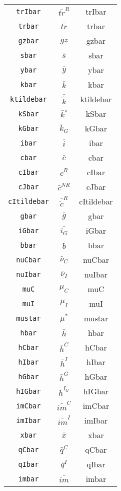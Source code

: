 \begin{center}
\begin{longtable}{ccc}
\texttt{trIbar} & $\bar{tr}^{R}$ & trIbar\\
\texttt{trbar} & $\bar{tr}$ & trbar\\
\texttt{gzbar} & $\bar{gz}$ & gzbar\\
\texttt{sbar} & $\bar{s}$ & sbar\\
\texttt{ybar} & $\bar{y}$ & ybar\\
\texttt{kbar} & $\bar{k}$ & kbar\\
\texttt{ktildebar} & $\bar{\tilde{k}}$ & ktildebar\\
\texttt{kSbar} & $\bar{k}^s$ & kSbar\\
\texttt{kGbar} & $\bar{k}_G$ & kGbar\\
\texttt{ibar} & $\bar{i}$ & ibar\\
\texttt{cbar} & $\bar{c}$ & cbar\\
\texttt{cIbar} & $\bar{c}^R$ & cIbar\\
\texttt{cJbar} & $\bar{c}^{NR}$ & cJbar\\
\texttt{cItildebar} & $\bar{\tilde{c}}^R$ & cItildebar\\
\texttt{gbar} & $\bar{g}$ & gbar\\
\texttt{iGbar} & $\bar{i_G}$ & iGbar\\
\texttt{bbar} & $\bar{b}$ & bbar\\
\texttt{nuCbar} & $\bar{\nu}_C$ & nuCbar\\
\texttt{nuIbar} & $\bar{\nu}_I$ & nuIbar\\
\texttt{muC} & $\mu_C$ & muC\\
\texttt{muI} & $\mu_I$ & muI\\
\texttt{mustar} & $\mu^*$ & mustar\\
\texttt{hbar} & $\bar{h}$ & hbar\\
\texttt{hCbar} & $\bar{h}^C$ & hCbar\\
\texttt{hIbar} & $\bar{h}^I$ & hIbar\\
\texttt{hGbar} & $\bar{h}^G$ & hGbar\\
\texttt{hIGbar} & $\bar{h}^{I_G}$ & hIGbar\\
\texttt{imCbar} & $\bar{im}^C$ & imCbar\\
\texttt{imIbar} & $\bar{im}^I$ & imIbar\\
\texttt{xbar} & $\bar{x}$ & xbar\\
\texttt{qCbar} & $\bar{q}^C$ & qCbar\\
\texttt{qIbar} & $\bar{q}^I$ & qIbar\\
\texttt{imbar} & $\bar{im}$ & imbar\\

\end{longtable}
\end{center}

